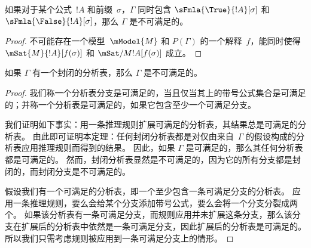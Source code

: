 \documentclass[../../../include/open-logic-section]{subfiles}
\begin{document}
\begin{prop}
  如果对于某个公式~$!A$ 和前缀~$\sigma$，$\Gamma$ 同时包含 $\sFmla{\True}{!A}[\sigma]$ 和
  $\sFmla{\False}{!A}[\sigma]$，那么 $\Gamma$ 是不可满足的。
\end{prop}

\begin{proof}
  不可能存在一个模型~$\mModel{M}$ 和 $P(\Gamma)$ 的一个解释~$f$，能同时使得 $\mSat{M}{!A}[f(\sigma)]$ 和
  $\mSat/{M}{!A}[f(\sigma)]$ 成立。
\end{proof}

\begin{thm}[可靠性]
  如果 $\Gamma$ 有一个封闭的分析表，那么 $\Gamma$ 是不可满足的。
\end{thm}

\begin{proof}
我们称一个分析表分支是可满足的，当且仅当其上的带号公式集合是可满足的；并称一个分析表是可满足的，如果它包含至少一个可满足分支。

我们证明如下事实：用一条推理规则扩展可满足的分析表，其结果总是可满足的分析表。
由此即可证明本定理：任何封闭分析表都是对仅由来自~$\Gamma$ 的假设构成的分析表应用推理规则而得到的结果。
因此，如果 $\Gamma$ 是可满足的，那么其任何分析表都是可满足的。
然而，封闭分析表显然是不可满足的，因为它的所有分支都是封闭的，而封闭分支是不可满足的。

假设我们有一个可满足的分析表，即一个至少包含一条可满足分支的分析表。
应用一条推理规则，要么会给某个分支添加带号公式，要么会将一个分支分裂成两个。
如果该分析表有一条可满足分支，而规则应用并未扩展这条分支，那么该分支在扩展后的分析表中依然是一条可满足分支，因此扩展后的分析表是可满足的。
所以我们只需考虑规则被应用到一条可满足分支上的情形。


\end{proof}
\end{document}
